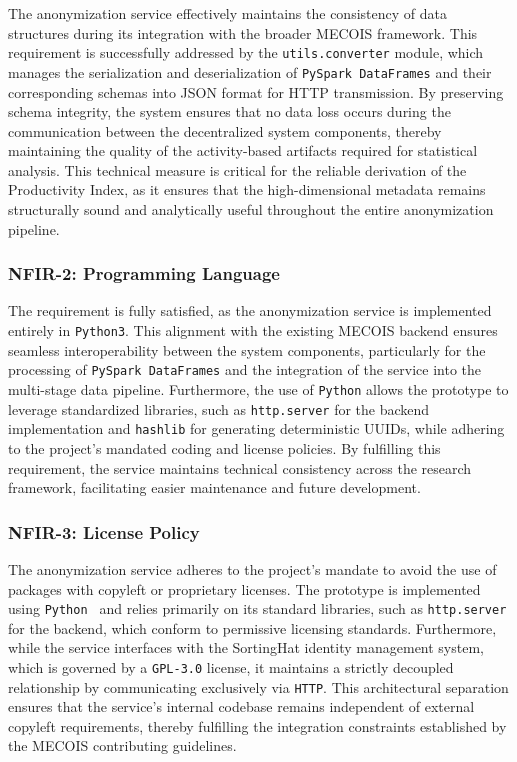 The anonymization service effectively maintains the consistency of data structures during its integration with the broader MECOIS framework. This requirement is successfully addressed by the \texttt{utils.converter} module, which manages the serialization and deserialization of \texttt{PySpark DataFrames} and their corresponding schemas into \ac{JSON} format for \ac{HTTP} transmission. By preserving schema integrity, the system ensures that no data loss occurs during the communication between the decentralized system components, thereby maintaining the quality of the activity-based artifacts required for statistical analysis. This technical measure is critical for the reliable derivation of the Productivity Index, as it ensures that the high-dimensional metadata remains structurally sound and analytically useful throughout the entire anonymization pipeline.

\subsubsection{NFIR-2: Programming Language}

The requirement is fully satisfied, as the anonymization service is implemented entirely in \texttt{Python3}. This alignment with the existing MECOIS backend ensures seamless interoperability between the system components, particularly for the processing of \texttt{PySpark DataFrames} and the integration of the service into the multi-stage data pipeline. Furthermore, the use of \texttt{Python} allows the prototype to leverage standardized libraries, such as \texttt{http.server} for the backend implementation and \texttt{hashlib} for generating deterministic \acp{UUID}, while adhering to the project's mandated coding and license policies. By fulfilling this requirement, the service maintains technical consistency across the research framework, facilitating easier maintenance and future development.

\subsubsection{NFIR-3: License Policy}

The anonymization service adheres to the project's mandate to avoid the use of packages with copyleft or proprietary licenses. The prototype is implemented using \texttt{Python } and relies primarily on its standard libraries, such as \texttt{http.server} for the backend, which conform to permissive licensing standards. Furthermore, while the service interfaces with the SortingHat identity management system, which is governed by a \texttt{GPL-3.0} license, it maintains a strictly decoupled relationship by communicating exclusively via \texttt{HTTP}. This architectural separation ensures that the service's internal codebase remains independent of external copyleft requirements, thereby fulfilling the integration constraints established by the MECOIS contributing guidelines.

